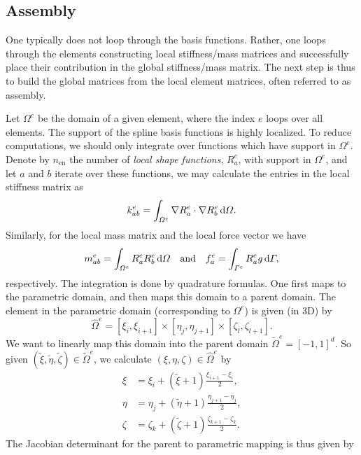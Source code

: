 \subsection{Assembly}
One typically does not loop through the basis functions. Rather, one loops through the elements constructing local stiffness/mass matrices and successfully place their contribution in the global stiffness/mass matrix. The next step is thus to build the global matrices from the local element matrices, often referred to as assembly.

Let $\Omega^e$ be the domain of a given element, where the index $e$ loops over all elements. The support of the spline basis functions is highly localized. To reduce computations, we should only integrate over functions which have support in $\Omega^e$. Denote by $n_{\mathrm{en}}$ the number of \textit{local shape functions}, $R_a^e$, with support in $\Omega^e$, and let $a$ and $b$ iterate over these functions, we may calculate the entries in the local stiffness matrix as
\begin{equation*}
	k_{ab}^e = \int_{\Omega^e} \nabla R_a^e\cdot\nabla R_b^e \, \mathrm{d}\Omega.
\end{equation*}
Similarly, for the local mass matrix and the local force vector we have
\begin{equation}\label{Eq:loading}
	m_{ab}^e = \int_{\Omega^e} R_a^e R_b^e \, \mathrm{d}\Omega\quad\text{and}\quad f_a^e = \int_{\Gamma^e} R_a^e g\, \mathrm{d}\Gamma,
\end{equation}
respectively. The integration is done by quadrature formulas. One first maps to the parametric domain, and then maps this domain to a parent domain. The element in the parametric domain (corresponding to $\Omega^e$) is given (in 3D) by 
\begin{equation*}
	\hat{\Omega}^e= [\xi_i,\xi_{i+1}]\times[\eta_j,\eta_{j+1}]\times[\zeta_l,\zeta_{l+1}].
\end{equation*}
We want to linearly map this domain into the parent domain $\tilde{\Omega}^e = [-1,1]^d$. So given $(\tilde{\xi},\tilde{\eta},\tilde{\zeta})\in \tilde{\Omega}^e$, we calculate $(\xi,\eta,\zeta)\in \hat{\Omega}^e$ by
\begin{align*}
	\xi &= \xi_i + (\tilde{\xi}+1)\frac{\xi_{i+1}-\xi_i}{2},\\
	\eta &= \eta_j + (\tilde{\eta}+1)\frac{\eta_{j+1}-\eta_j}{2},\\
	\zeta &= \zeta_k + (\tilde{\zeta}+1)\frac{\zeta_{k+1}-\zeta_k}{2}.
\end{align*}
The Jacobian determinant for the parent to parametric mapping is thus given by

